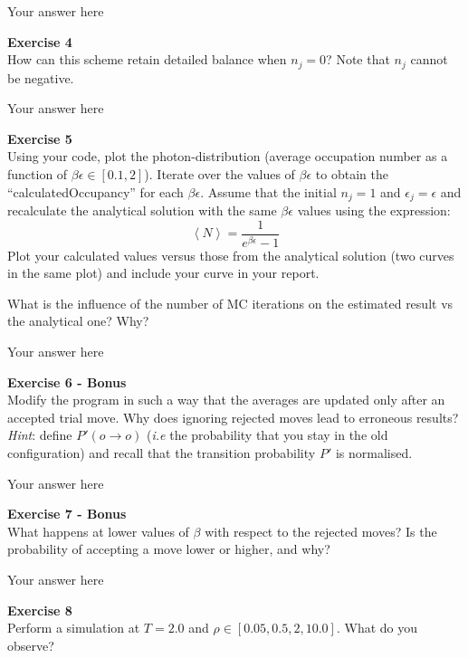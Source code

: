 \documentclass{article}
\begin{document}
Your answer here

\begin{mdframed}
\textbf{Exercise 4}\\
How can this scheme retain detailed balance when $n_j = 0$? Note that $n_j$  cannot be negative.
\end{mdframed}

Your answer here

\begin{mdframed}
\textbf{Exercise 5}\\
Using your code, plot the photon-distribution (average occupation number as a function of $\beta\epsilon\in[0.1,2]$). Iterate over the values of $\beta\epsilon$ to obtain the ``calculatedOccupancy'' for each $\beta\epsilon$.
Assume that the initial $n_j =1$ and $\epsilon_j=\epsilon$ and recalculate the analytical solution with the same $\beta\epsilon$ values using the expression:
\begin{equation}
\left< N \right> = \frac{1}{e^{\beta\epsilon}-1}
\end{equation}
Plot your calculated values versus those from the analytical solution (two curves in the same plot) and include your curve in your report.

What is the influence of the number of MC iterations on the estimated result vs the analytical one? Why?
\end{mdframed}

Your answer here

\begin{mdframed}
\textbf{Exercise 6 - Bonus}\\
Modify the program in such a way that the averages are updated only after an accepted trial move. Why does ignoring rejected moves lead to erroneous results? \textit{Hint}: define $P'(o \rightarrow o)$ (\textit{i.e}  the probability that you stay in the old configuration) and recall that the transition probability $P'$ is normalised.
\end{mdframed}

Your answer here

\begin{mdframed}
\textbf{Exercise 7 - Bonus}\\
What happens at lower values of $\beta$ with respect to the rejected moves? Is the probability of accepting a move lower or higher, and why?
\end{mdframed}

Your answer here

\begin{mdframed}
\textbf{Exercise 8}\\
Perform a simulation at $T = 2.0$ and $\rho \in [0.05, 0.5, 2, 10.0]$. What do you observe?
\end{mdframed}
\end{document}
